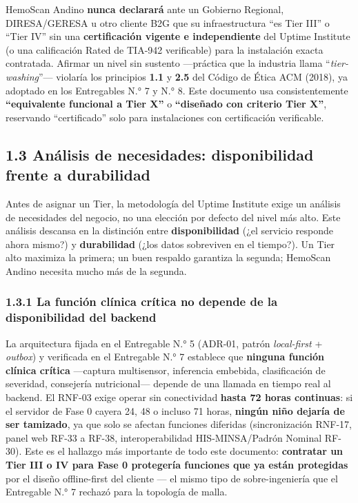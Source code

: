 \documentclass[11pt,a4paper]{article}
\begin{document}
HemoScan Andino \textbf{nunca declarará} ante un Gobierno Regional, DIRESA/GERESA u otro cliente B2G que su infraestructura ``es Tier III'' o ``Tier IV'' sin una \textbf{certificación vigente e independiente} del Uptime Institute (o una calificación Rated de TIA-942 verificable) para la instalación exacta contratada. Afirmar un nivel sin sustento ---práctica que la industria llama ``\emph{tier-washing}''--- violaría los principios \textbf{1.1} y \textbf{2.5} del Código de Ética ACM (2018), ya adoptado en los Entregables N.° 7 y N.° 8. Este documento usa consistentemente \textbf{``equivalente funcional a Tier X''} o \textbf{``diseñado con criterio Tier X''}, reservando ``certificado'' solo para instalaciones con certificación verificable.

\subsection{1.3 Análisis de necesidades: disponibilidad frente a durabilidad}\label{anuxe1lisis-de-necesidades-disponibilidad-frente-a-durabilidad}

Antes de asignar un Tier, la metodología del Uptime Institute exige un análisis de necesidades del negocio, no una elección por defecto del nivel más alto. Este análisis descansa en la distinción entre \textbf{disponibilidad} (¿el servicio responde ahora mismo?) y \textbf{durabilidad} (¿los datos sobreviven en el tiempo?). Un Tier alto maximiza la primera; un buen respaldo garantiza la segunda; HemoScan Andino necesita mucho más de la segunda.

\subsubsection{1.3.1 La función clínica crítica no depende de la disponibilidad del backend}\label{la-funciuxf3n-cluxednica-cruxedtica-no-depende-de-la-disponibilidad-del-backend}

La arquitectura fijada en el Entregable N.° 5 (ADR-01, patrón \emph{local-first} + \emph{outbox}) y verificada en el Entregable N.° 7 establece que \textbf{ninguna función clínica crítica} ---captura multisensor, inferencia embebida, clasificación de severidad, consejería nutricional--- depende de una llamada en tiempo real al backend. El RNF-03 exige operar sin conectividad \textbf{hasta 72 horas continuas}: si el servidor de Fase 0 cayera 24, 48 o incluso 71 horas, \textbf{ningún niño dejaría de ser tamizado}, ya que solo se afectan funciones diferidas (sincronización RNF-17, panel web RF-33 a RF-38, interoperabilidad HIS-MINSA/Padrón Nominal RF-30). Este es el hallazgo más importante de todo este documento: \textbf{contratar un Tier III o IV para Fase 0 protegería funciones que ya están protegidas} por el diseño offline-first del cliente --- el mismo tipo de sobre-ingeniería que el Entregable N.° 7 rechazó para la topología de malla.
\end{document}
